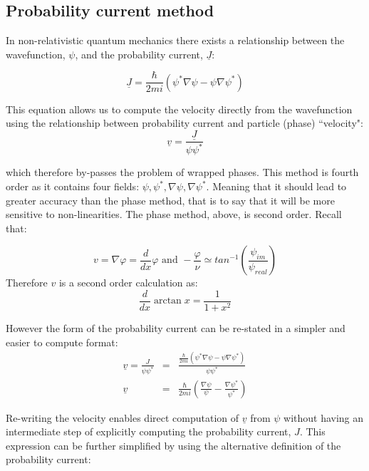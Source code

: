\subsection{Probability current method}
\label{sec_j}
In non-relativistic quantum mechanics there exists a relationship between the wavefunction, $\psi$, and the probability current, $\underline{J}$:

\begin{equation}
\label{eqn_j}
 \underline{J} = \frac{\hbar}{2mi} (\psi^* \nabla \psi - \psi \nabla \psi^*)
\end{equation}

\noindent This equation allows us to compute the velocity directly from the wavefunction using the relationship between probability current and particle (phase) ``velocity":
\begin{equation}
\label{eqn_vj}
\underline{v} = \frac{\underline{J}}{\psi\psi^*}
\end{equation}

\noindent which therefore by-passes the problem of wrapped phases. This method is fourth order as it contains four fields: $\psi,\psi^*,\nabla\psi,\nabla\psi^*$. Meaning that it should lead to greater accuracy than the phase method, that is to say that it will be more sensitive to non-linearities. The phase method, above, is second order. Recall that:

\begin{equation}
 v = \nabla \varphi=\frac{d}{dx}\varphi \mbox{ and } -\frac{\varphi}{\nu} \simeq tan^{-1} (\frac{\psi_{im}}{\psi_{real}})
\end{equation}
 \noindent Therefore $v$ is a second order calculation as:
\begin{equation}
\frac{d}{dx} \arctan x = \frac{1}{1 + x^2}
\end{equation}

\noindent However the form of the probability current can be re-stated in a simpler and easier to compute format:
\begin{eqnarray}
 \underline{v} = \frac{J}{\psi\psi^*} &=& \frac{\frac{\hbar}{2mi} (\psi^* \nabla \psi - \psi \nabla \psi^*)}{\psi\psi^*}\\
 \underline{v} &=& \frac{\hbar}{2mi}\left(\frac{\nabla \psi}{\psi} - \frac{\nabla \psi^*}{\psi^*} \right)
\end{eqnarray}

\noindent Re-writing the velocity enables direct computation of $\underline{v}$ from $\psi$ without having an intermediate step of explicitly computing the probability current, $J$. This expression can be further simplified by using the alternative definition of the probability current:


